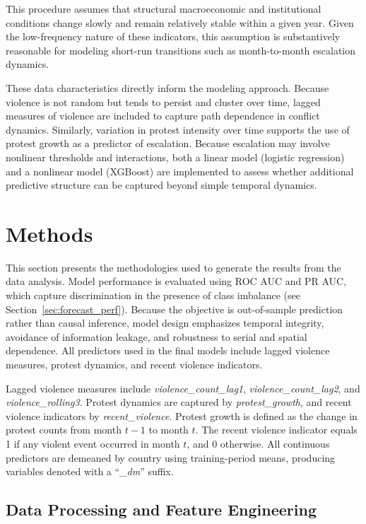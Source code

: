 \documentclass[12pt]{article}
\begin{document}
This procedure assumes that structural macroeconomic and institutional conditions change slowly and remain relatively stable within a given year. Given the low-frequency nature of these indicators, this assumption is substantively reasonable for modeling short-run transitions such as month-to-month escalation dynamics.

These data characteristics directly inform the modeling approach. Because violence is not random but tends to persist and cluster over time, lagged measures of violence are included to capture path dependence in conflict dynamics. Similarly, variation in protest intensity over time supports the use of protest growth as a predictor of escalation. Because escalation may involve nonlinear thresholds and interactions, both a linear model (logistic regression) and a nonlinear model (XGBoost) are implemented to assess whether additional predictive structure can be captured beyond simple temporal dynamics.


\section{Methods}
\label{sec:meth}

This section presents the methodologies used to generate the results from the data analysis. Model performance is evaluated using ROC AUC and PR AUC, which capture discrimination in the presence of class imbalance (see Section~\ref{sec:forecast_perf}). Because the objective is out-of-sample prediction rather than causal inference, model design emphasizes temporal integrity, avoidance of information leakage, and robustness to serial and spatial dependence. All predictors used in the final models include lagged violence measures, protest dynamics, and recent violence indicators.

Lagged violence measures include 
\emph{violence\_count\_lag1}, \emph{violence\_count\_lag2}, and 
\emph{violence\_rolling3}. Protest dynamics are captured by 
\emph{protest\_growth}, and recent violence indicators by 
\emph{recent\_violence}. Protest growth is defined as the change in protest counts from month \(t-1\) to month \(t\). The recent violence indicator equals 1 if any violent event occurred in month \(t\), and 0 otherwise. All continuous predictors are demeaned by country using training-period means, producing variables denoted with a “\emph{\_dm}” suffix.

\subsection{Data Processing and Feature Engineering}
\end{document}
